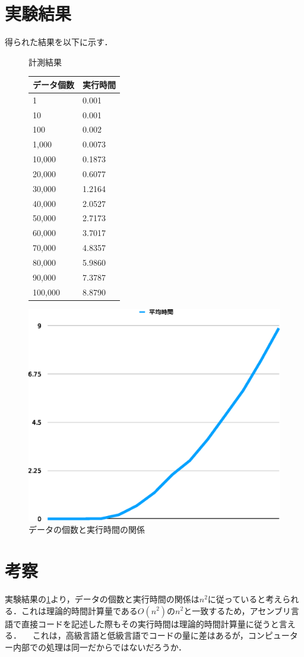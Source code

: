 \section{実験結果}
得られた結果を以下に示す．
\begin{figure}[h]
  \begin{minipage}{0.45\textwidth}
  \centering
  \caption{計測結果}
  \begin{tabular}{ll}
    データ個数 & 実行時間\\ \hline
    1 & 0.001\\
    10 & 0.001\\
    100 & 0.002\\
    1,000 & 0.0073\\
    10,000 & 0.1873\\
    20,000 & 0.6077\\
    30,000 & 1.2164\\
    40,000 & 2.0527\\
    50,000 & 2.7173\\
    60,000 & 3.7017\\
    70,000 & 4.8357\\
    80,000 & 5.9860\\
    90,000 & 7.3787\\
    100,000 & 8.8790\\ \hline
  \end{tabular}
  \end{minipage}
  \begin{minipage}{0.45\textwidth}
    \caption{データの個数と実行時間の関係}
    \label{fig:実行時間グラフ}
      \includegraphics[scale=0.5]{exdata.eps}
    \end{minipage}
\end{figure}

\section{考察}
実験結果の\ref{fig:実行時間グラフ}より，データの個数と実行時間の関係は$n^2$に従っていると考えられる．これは理論的時間計算量である$O(n^2)$の$n^2$と一致するため，アセンブリ言語で直接コードを記述した際もその実行時間は理論的時間計算量に従うと言える．
 \ \ これは，高級言語と低級言語でコードの量に差はあるが，コンピューター内部での処理は同一だからではないだろうか．
